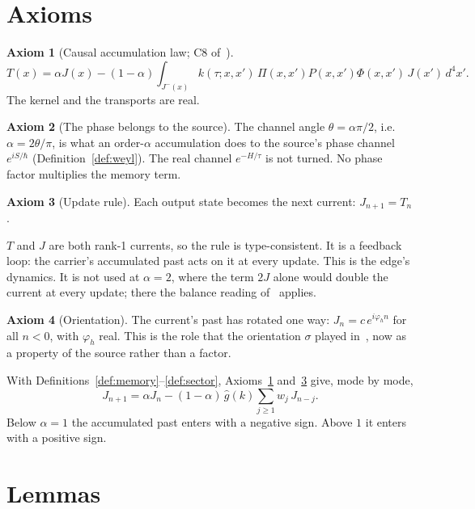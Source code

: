 \documentclass[11pt]{amsart}
\theoremstyle{definition}
\newtheorem{axiom}{Axiom}
\theoremstyle{remark}
\begin{document}
\section{Axioms}

\begin{axiom}[Causal accumulation law; C8 of~\cite{CAL}]\label{ax:CAL}
\[
T(x)=\alpha J(x)-(1-\alpha)\int_{J^-(x)}k(\tau;x,x')\,\Pi(x,x')P(x,x')\Phi(x,x')\,J(x')\,d^4x'.
\]
The kernel and the transports are real.
\end{axiom}

\begin{axiom}[The phase belongs to the source]\label{ax:phase}
The channel angle $\theta=\alpha\pi/2$, i.e.\ $\alpha=2\theta/\pi$, is what an order-$\alpha$ accumulation does to the source's phase channel $e^{iS/\hbar}$ (Definition~\ref{def:weyl}). The real channel $e^{-H/\tau}$ is not turned. No phase factor multiplies the memory term.
\end{axiom}

\begin{axiom}[Update rule]\label{ax:update}
Each output state becomes the next current: $J_{n+1}=T_n$.
\end{axiom}

$T$ and $J$ are both rank-1 currents, so the rule is type-consistent. It is a feedback loop: the carrier's accumulated past acts on it at every update. This is the edge's dynamics. It is not used at $\alpha=2$, where the term $2J$ alone would double the current at every update; there the balance reading of~\cite{Alpha2} applies.

\begin{axiom}[Orientation]\label{ax:orientation}
The current's past has rotated one way: $J_n=c\,e^{i\varphi_hn}$ for all $n<0$, with $\varphi_h$ real. This is the role that the orientation $\sigma$ played in~\cite{Skeleton}, now as a property of the source rather than a factor.
\end{axiom}

With Definitions~\ref{def:memory}--\ref{def:sector}, Axioms~\ref{ax:CAL} and~\ref{ax:update} give, mode by mode,
\begin{equation}\label{eq:update}
J_{n+1}=\alpha J_n-(1-\alpha)\,\hat g(k)\sum_{j\ge1}w_j\,J_{n-j}.
\end{equation}
Below $\alpha=1$ the accumulated past enters with a negative sign. Above $1$ it enters with a positive sign.

\section{Lemmas}
\end{document}
